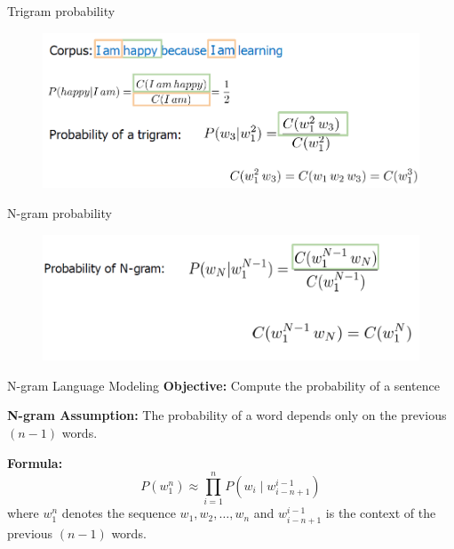\begin{frame}{Trigram probability}
    \begin{figure}
        \centering
        \includegraphics[width=\textwidth,height=0.8\textheight,keepaspectratio]{images/nlp-intro/trigram-probability.png}
    \end{figure}
\end{frame}

\begin{frame}{N-gram probability}
    \begin{figure}
        \centering
        \includegraphics[width=\textwidth,height=0.8\textheight,keepaspectratio]{images/nlp-intro/ngram-probability.png}
    \end{figure}
\end{frame}

\begin{frame}{N-gram Language Modeling}
    \textbf{Objective:} Compute the probability of a sentence

    \vspace{1em}
    \textbf{N-gram Assumption:} The probability of a word depends only on the previous $(n-1)$ words.

    \vspace{1em}
    \textbf{Formula:}
    \[
        P(w_1^n) \approx \prod_{i=1}^{n} P(w_i \mid w_{i-n+1}^{i-1})
    \]
    where $w_1^n$ denotes the sequence $w_1, w_2, \ldots, w_n$ and $w_{i-n+1}^{i-1}$ is the context of the previous $(n-1)$ words.
\end{frame}

